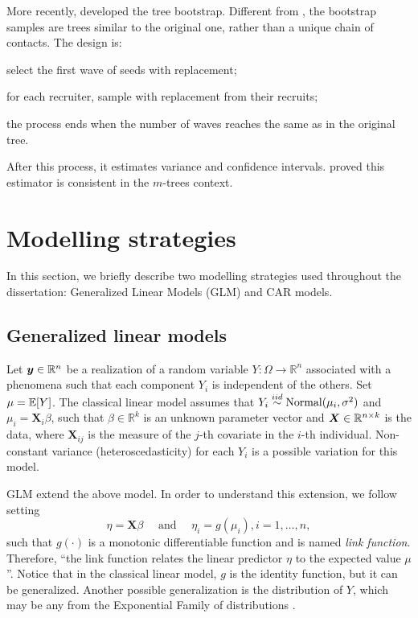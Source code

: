 More recently, \textcite{baraff2016estimating} developed the tree bootstrap.
Different from \textcite{salganik2006variance}, the bootstrap samples are
trees similar to the original one, rather than a unique chain of contacts. The
design is:
\begin{alineas}
  \item select the first wave of seeds with replacement; 
  \item for each recruiter, sample with replacement from their recruits;
  \item the process ends when the number of waves reaches the same as in the original tree. 
\end{alineas}
After this process, it estimates variance and confidence intervals.
\textcite{green2020consistency} proved this estimator is consistent in the
$m$-trees context.

\section{Modelling strategies}

In this section, we briefly describe two modelling strategies used
throughout the dissertation: Generalized Linear Models (GLM) and CAR models. 

\subsection{Generalized linear models}
\label{sec:glm}

Let $\boldsymbol{y} \in \mathbb{R}^n$ be a realization of a random variable $Y :
\Omega \to \mathbb{R}^n$ associated with a phenomena such that each component
$Y_i$ is independent of the others. Set $\mu = \mathbb{E}[Y]$. The classical linear
model assumes that $Y_i \overset{iid}{\sim} \operatorname{Normal}(\mu_i, \sigma^2)$ and $\mu_i =
\boldsymbol{X}_i\beta$, such that $\beta \in \mathbb{R}^k$ is an unknown parameter vector and
$\boldsymbol{X} \in \mathbb{R}^{n \times k}$ is the data, where $\boldsymbol{X}_{ij}$
is the measure of the $j$-th covariate in the $i$-th individual. Non-constant
variance (heteroscedasticity) for each $Y_i$ is a possible variation for this model. 

GLM extend the above model. In order to understand
this extension, we follow \textcite[p. 27]{mccullagh2019generalized} setting 
\begin{equation*}
  \eta = \boldsymbol{X}\beta \quad \text{ and } \quad \eta_i = g(\mu_i), i = 1, \dots, n,
\end{equation*}
such that $g(\cdot)$ is a monotonic differentiable function and is named {\em
link function}. Therefore, ``the link function relates the linear predictor
$\eta$ to the expected value $\mu$ ''\cite[p. 31]{mccullagh2019generalized}.
Notice that in the classical linear model, $g$ is the identity function, but
it can be generalized. Another possible generalization is the distribution of
$Y$, which may be any from the Exponential Family of distributions \cite[p.
115]{Robert2007}. 

